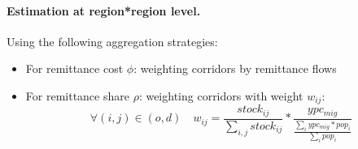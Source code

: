 \documentclass[letterpaper,11pt]{article}
\begin{document}
\paragraph{Estimation at region*region level.}
Using the following aggregation strategies: 
\begin{itemize}
	\item For remittance cost $\phi$: weighting corridors by remittance flows 
	\item For remittance share $\rho$: weighting corridors with weight $w_{ij}$:
		\begin{equation} \label{eq:weight}
			\forall (i,j) \in (o,d) \quad w_{ij} = \frac{stock_{ij}}{\sum_{i,j}stock_{ij}} * \frac{ypc_{mig}}{\frac{\sum_i ypc_{mig} * pop_i}{\sum_i pop_i}}
		\end{equation}
\end{itemize}
\end{document}
